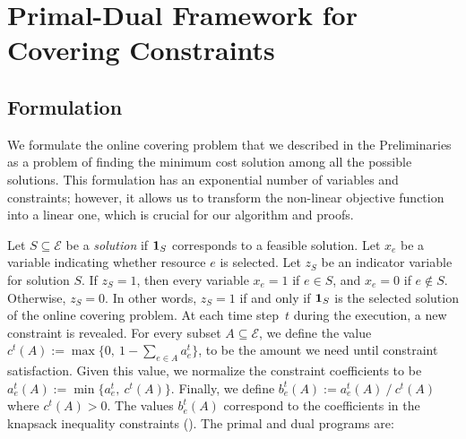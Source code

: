 
\section{Primal-Dual Framework for Covering Constraints}		\label{sec:covering}

\subsection{Formulation}
We formulate the online covering problem that we described in the Preliminaries as a problem of finding the minimum cost solution among all the possible solutions. This formulation has an exponential number of variables and constraints; however, it allows us to transform the non-linear objective function into a linear one, which is crucial for our algorithm and proofs.

Let $S \subseteq \mathcal{E}$ be a \emph{solution} if $\mathbf{1}_{S}$ corresponds to a feasible solution. Let $x_{e}$ be a variable indicating whether resource $e$ is selected.
Let $z_{S}$ be an indicator variable for solution $S$. If $z_{S} = 1$, then every variable
$x_{e} = 1$ if $e \in S$, and $x_{e} = 0$ if $e \notin S$. Otherwise, $z_S = 0$. In other words, $z_{S} = 1$ if and only if $\mathbf{1}_{S}$ is the selected solution of the online covering problem. At each time step~$t$ during the execution, a new constraint is revealed. For every subset $A \subseteq \mathcal{E}$, we define the value $c^{t}(A) := \max\{0,\ 1 - \sum_{e \in A} a^{t}_{e}\}$, to be the amount we need until constraint satisfaction. Given this value, we normalize the constraint coefficients to be $a^{t}_{e}(A) := \min\{a_{e}^{t},\ c^{t}(A)\}$. Finally, we define $b^{t}_{e}(A) := a^{t}_{e}(A)\ /\ c^{t}(A)$ where $c^{t}(A) > 0$. The values $b^{t}_{e}(A)$ correspond to the coefficients in the knapsack inequality constraints (\cite{CarrFleischer:2000}). The primal and dual programs are:

